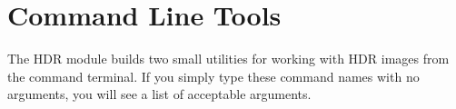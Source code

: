 




\section{Command Line Tools}

The HDR module builds two small utilities for working with HDR images
from the command terminal.  If you simply type these command names
with no arguments, you will see a list of acceptable arguments.

